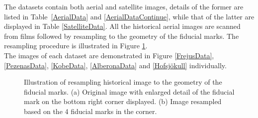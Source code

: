 The datasets contain both aerial and satellite images, details of the former are listed in Table~\ref{AerialData} and \ref{AerialDataContinue}, while that of the latter are displayed in Table \ref{SatelliteData}. All the historical aerial images are scanned from films followed by resampling to the geometry of the fiducial marks. The resampling procedure is illustrated in Figure \ref{Resample}. \\
The images of each dataset are demonstrated in Figure \ref{FrejusData}, \ref{PezenasData}, \ref{KobeData}, \ref{AlberonaData} and \ref{Hofsjökull} individually. 

\begin{figure}[htbp]
	\begin{center}
		\caption{Illustration of resampling historical image to the geometry of the fiducial marks. (a) Original image with enlarged detail of the fiducial mark on the bottom right corner displayed. (b) Image resampled based on the 4 fiducial marks in the corner.} 
		\label{Resample}
	\end{center}
\end{figure} 

